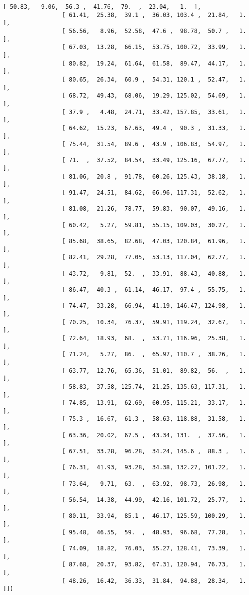 \documentclass[11pt]{article}
\begin{document}
\begin{Verbatim}[commandchars=\\\{\}]
                 [ 50.83,   9.06,  56.3 ,  41.76,  79.  ,  23.04,   1.  ],
                 [ 61.41,  25.38,  39.1 ,  36.03, 103.4 ,  21.84,   1.  ],
                 [ 56.56,   8.96,  52.58,  47.6 ,  98.78,  50.7 ,   1.  ],
                 [ 67.03,  13.28,  66.15,  53.75, 100.72,  33.99,   1.  ],
                 [ 80.82,  19.24,  61.64,  61.58,  89.47,  44.17,   1.  ],
                 [ 80.65,  26.34,  60.9 ,  54.31, 120.1 ,  52.47,   1.  ],
                 [ 68.72,  49.43,  68.06,  19.29, 125.02,  54.69,   1.  ],
                 [ 37.9 ,   4.48,  24.71,  33.42, 157.85,  33.61,   1.  ],
                 [ 64.62,  15.23,  67.63,  49.4 ,  90.3 ,  31.33,   1.  ],
                 [ 75.44,  31.54,  89.6 ,  43.9 , 106.83,  54.97,   1.  ],
                 [ 71.  ,  37.52,  84.54,  33.49, 125.16,  67.77,   1.  ],
                 [ 81.06,  20.8 ,  91.78,  60.26, 125.43,  38.18,   1.  ],
                 [ 91.47,  24.51,  84.62,  66.96, 117.31,  52.62,   1.  ],
                 [ 81.08,  21.26,  78.77,  59.83,  90.07,  49.16,   1.  ],
                 [ 60.42,   5.27,  59.81,  55.15, 109.03,  30.27,   1.  ],
                 [ 85.68,  38.65,  82.68,  47.03, 120.84,  61.96,   1.  ],
                 [ 82.41,  29.28,  77.05,  53.13, 117.04,  62.77,   1.  ],
                 [ 43.72,   9.81,  52.  ,  33.91,  88.43,  40.88,   1.  ],
                 [ 86.47,  40.3 ,  61.14,  46.17,  97.4 ,  55.75,   1.  ],
                 [ 74.47,  33.28,  66.94,  41.19, 146.47, 124.98,   1.  ],
                 [ 70.25,  10.34,  76.37,  59.91, 119.24,  32.67,   1.  ],
                 [ 72.64,  18.93,  68.  ,  53.71, 116.96,  25.38,   1.  ],
                 [ 71.24,   5.27,  86.  ,  65.97, 110.7 ,  38.26,   1.  ],
                 [ 63.77,  12.76,  65.36,  51.01,  89.82,  56.  ,   1.  ],
                 [ 58.83,  37.58, 125.74,  21.25, 135.63, 117.31,   1.  ],
                 [ 74.85,  13.91,  62.69,  60.95, 115.21,  33.17,   1.  ],
                 [ 75.3 ,  16.67,  61.3 ,  58.63, 118.88,  31.58,   1.  ],
                 [ 63.36,  20.02,  67.5 ,  43.34, 131.  ,  37.56,   1.  ],
                 [ 67.51,  33.28,  96.28,  34.24, 145.6 ,  88.3 ,   1.  ],
                 [ 76.31,  41.93,  93.28,  34.38, 132.27, 101.22,   1.  ],
                 [ 73.64,   9.71,  63.  ,  63.92,  98.73,  26.98,   1.  ],
                 [ 56.54,  14.38,  44.99,  42.16, 101.72,  25.77,   1.  ],
                 [ 80.11,  33.94,  85.1 ,  46.17, 125.59, 100.29,   1.  ],
                 [ 95.48,  46.55,  59.  ,  48.93,  96.68,  77.28,   1.  ],
                 [ 74.09,  18.82,  76.03,  55.27, 128.41,  73.39,   1.  ],
                 [ 87.68,  20.37,  93.82,  67.31, 120.94,  76.73,   1.  ],
                 [ 48.26,  16.42,  36.33,  31.84,  94.88,  28.34,   1.  ]])
\end{Verbatim}
            
\end{document}
